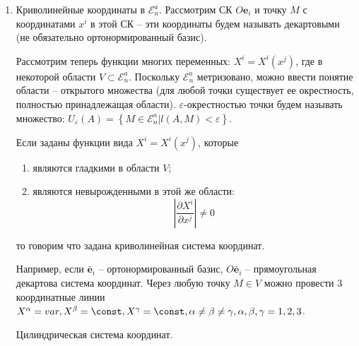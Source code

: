 \begin{enumerate}
  \item Криволинейные координаты в $\mathcal{E}_n^a$. Рассмотрим СК $O\mathbf{e}_i$ и точку $M$ с
    координатами $x^i$ в этой СК -- эти координаты будем называть декартовыми (не обязательно
    ортонормированный базис).
    
    \begin{figure}[H]
    	\centering
    	
    \end{figure}
    
    Рассмотрим теперь функции многих переменных: $X^i = X^i (x^j)$, где в некоторой области
    $V \subset \mathcal{E}_n^a$. Поскольку $\mathcal{E}_n^a$ метризовано, можно ввести понятие 
    области -- открытого множества (для любой точки существует ее окрестность, полностью
    принадлежащая области). $\varepsilon$-окрестностью точки будем называть множество:
    $U_\varepsilon(A) = \left\{ M \in \mathcal{E}_n^a | l(A, M) < \varepsilon \right\} $.
    
    \begin{figure}[H]
    	\centering
    	
    \end{figure}
    
    Если заданы функции вида $X^i = X^i (x^j)$, которые
    \begin{enumerate}
      \item являются гладкими в области $V$;
      \item являются невырожденными в этой же области:
        \[
          \left| \dfrac{\partial X^i}{\partial x^j} \right| \neq 0
        \]
    \end{enumerate}
    то говорим что задана криволинейная система координат.
  
    Например, если $\bar{\mathbf{e}}_i$ -- ортонормированный базис, $O\bar{\mathbf{e}}_i$ -- прямоугольная
    декартова система координат. Через любую точку $M \in V$ можно провести 3 координатные линии
    $X^\alpha = var, X^{\beta} = \const, X^\gamma = \const, \alpha \neq \beta \neq \gamma, \alpha, \beta, \gamma = 1, 2, 3$.
    
    \begin{figure}[H]
    	\centering
    	
    \end{figure}

	\begin{example}
		Цилиндрическая система координат. 
		
		\begin{figure}[H]
			\centering
			
		\end{figure}
		

\end{example}
\end{enumerate}
